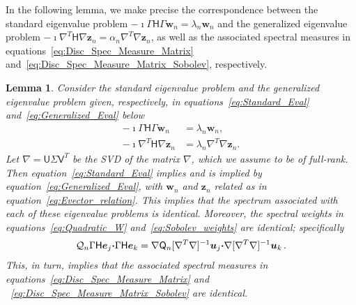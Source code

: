 \documentclass[english,12pt,jmp,graphicx]{revtex4-1}
\newcommand{\vecw}{\boldsymbol{w}}
\newcommand{\vecu}{\boldsymbol{u}}
\newcommand{\vecz}{\boldsymbol{z}}
\newcommand{\vece}{\boldsymbol{e}}
\newcommand{\bcdot}{\mbox{\boldmath${\cdot}$}}
\newtheorem{lemma}[theorem]{Lemma}
\newcommand{\Hm}{\mathsf{H}}
\newcommand{\Um}{\mathsf{U}}
\newcommand{\Vm}{\mathsf{V}}
\newcommand{\Qm}{\mathsf{Q}}
\newcommand{\Qc}{\mathcal{Q}}
\begin{document}
In the following lemma, we make precise the correspondence
between the standard eigenvalue problem $-\imath\Gamma\Hm\Gamma\vecw_n=\lambda_n\vecw_n$
and the generalized eigenvalue problem
$-\imath\nabla^T\Hm\nabla\vecz_n=\alpha_n\nabla^T\nabla\vecz_n$, as well as the associated spectral measures
in equations~\eqref{eq:Disc_Spec_Measure_Matrix}
and~\eqref{eq:Disc_Spec_Measure_Matrix_Sobolev}, respectively.  
%
\begin{lemma}\label{lem:Spectral_Equivalence}
Consider the standard eigenvalue problem and the generalized
eigenvalue problem given, respectively, in
equations~\eqref{eq:Standard_Eval} and~\eqref{eq:Generalized_Eval}
below 
%
\begin{align}
  \label{eq:Standard_Eval}
  -\imath\Gamma\Hm\Gamma\vecw_n&=\lambda_n\vecw_n,
  \\
  \label{eq:Generalized_Eval}
  -\imath\nabla^T\Hm\nabla\vecz_n&=\lambda_n\nabla^T\nabla\vecz_n.
\end{align}
%
Let $\nabla=\Um\Sigma\Vm^T$ be the SVD of the matrix
$\nabla$, which we assume to be of full-rank. Then
equation~\eqref{eq:Standard_Eval} implies and is implied by
equation~\eqref{eq:Generalized_Eval}, with $\vecw_n$ and $\vecz_n$
related as in equation~\eqref{eq:Evector_relation}. This
implies that the spectrum associated with each of these 
eigenvalue problems is identical. Moreover, 
the spectral weights in equations~\eqref{eq:Quadratic_W}
and~\eqref{eq:Sobolev_weights}
are identical; specifically
%
\begin{align}\label{eq:Discrete_Weight_Equivalence}
  \Qc_n\Gamma\Hm\vece_j\bcdot\Gamma\Hm\vece_k=\nabla\Qm_n[\nabla^T\nabla]^{-1}\vecu_j\bcdot\nabla[\nabla^T\nabla]^{-1}\vecu_k\,. 
\end{align}
%
This, in turn, implies that the associated spectral measures in
equations~\eqref{eq:Disc_Spec_Measure_Matrix} and
~\eqref{eq:Disc_Spec_Measure_Matrix_Sobolev} are identical. 
\end{lemma}
%
\end{document}
